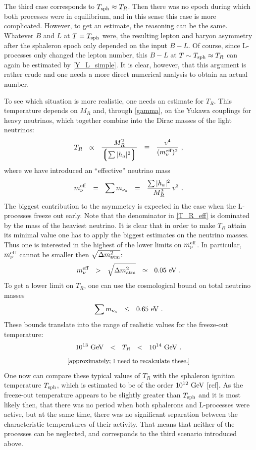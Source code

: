 \documentclass[12pt]{revtex4}
\newcommand{\lgr}{\left\lgroup}
\newcommand{\rgr}{\right\rgroup}
\newcommand{\Tsph}{T_{\rm sph}}
\newcommand{\meff}{m^{\rm eff}_\nu}
\newcommand{\GeV}{{\rm GeV}}
\newcommand{\eV}{{\rm eV}}
\begin{document}
	The third case corresponds to $ \Tsph \approx T_R $.
	Then there was no epoch during which both processes
	were in equilibrium, and in this sense this case is more complicated.
	However, to get an estimate, the reasoning can be 
	the same.
	Whatever $ B $ and $ L $ at $ T = \Tsph $ were, the resulting
	lepton and baryon asymmetry after the sphaleron epoch only
	depended on the input $ B - L $.
	Of course, since L-processes only changed the lepton number,
	this $ B - L $ at  $ T \sim \Tsph \approx T_R $ can 
	again be estimated by \eqref{Y_L_simple}.
	It is clear, however, that this argument is rather crude and 
	one needs a more direct numerical analysis to obtain an actual
	number.

	To see which situation is more realistic, one needs an estimate
	for $ T_R $. 
	This temperature depends on $ M_R $ and, through \eqref{gamma},
	on the Yukawa couplings for heavy neutrinos, which together 
	combine into the Dirac masses of the light neutrinos:
\begin{equation}
\label{T_R_eff}
	T_R  ~~\propto~~ \frac{M_R^2}{\lgr \sum |h_a|^2 \rgr}
		~~\equiv~~ \frac{v^4}{(\meff)^2}~,
\end{equation}
	where we have introduced an ``effective'' neutrino mass
\[
	\meff ~~=~~ \sum m_{\nu_a} ~~=~~ \frac{\sum |h_a|^2}{M_R^2}\,v^2~.
\]
	The biggest contribution to the asymmetry is expected in the case
	when the L-processes freeze out early. 
	Note that the denominator in \eqref{T_R_eff} is dominated by the mass
	of the heaviest neutrino.
	It is clear that in order to make $ T_R $  attain its minimal
	value one has to apply the biggest estimates on the neutrino masses.
	Thus one is interested in the highest of the lower limits on
	$ \meff $.
	In particular, $ \meff $ cannot be smaller then 
	$ \sqrt{\Delta m_{\rm atm}^2}$:
\[
	\meff ~~>~~ \sqrt{\Delta m_{\rm atm}^2} ~~\simeq~~ 0.05~\eV~.
\]
	To get a lower limit on $ T_R $, one can use the cosmological
	bound on total neutrino masses
\[
	\sum m_{\nu_a} ~~\leq~~ 0.65~\eV~.
\]
	These bounds translate into the range of realistic values for the
	freeze-out temperature:
\[
	10^{13}~\GeV ~~<~~ T_R ~~<~~ 10^{14}~\GeV~.
\]
\[
	[\textrm{\small approximately; I need to recalculate these.}]
\]
	One now can compare these typical values of $ T_R $ with the 
	sphaleron ignition temperature $ \Tsph $, which is estimated
	to be of the order $ 10^{12}~\GeV $ [ref].
	As the freeze-out temperature appears to be slightly greater
	than $ \Tsph $ and 	
	it is most likely then, that there was no period when
	both sphalerons and L-processes were active, but at the same
	time, there was no significant separation between the characteristic 
	temperatures of their activity.
	That means that neither of the processes can be neglected,
	and corresponds to the third scenario introduced above.
\end{document}
